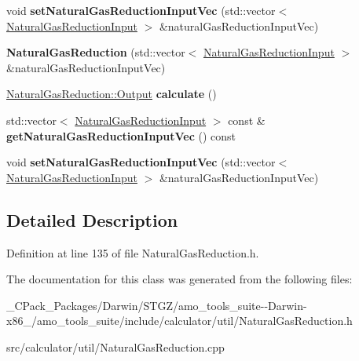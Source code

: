 \begin{DoxyCompactItemize}
\mbox{\label{class_natural_gas_reduction_a37d449a4d5f274fdebb855c1f8d0d32d}} 
void {\bfseries set\+Natural\+Gas\+Reduction\+Input\+Vec} (std\+::vector$<$ \hyperlink{class_natural_gas_reduction_input}{Natural\+Gas\+Reduction\+Input} $>$ \&natural\+Gas\+Reduction\+Input\+Vec)
\item 
\mbox{\label{class_natural_gas_reduction_a7648caebf3f12a0c7bb347e9d18e64d8}} 
{\bfseries Natural\+Gas\+Reduction} (std\+::vector$<$ \hyperlink{class_natural_gas_reduction_input}{Natural\+Gas\+Reduction\+Input} $>$ \&natural\+Gas\+Reduction\+Input\+Vec)
\item 
\mbox{\label{class_natural_gas_reduction_ae9eed40d094032c9b7a493e995d6d21d}} 
\hyperlink{struct_natural_gas_reduction_1_1_output}{Natural\+Gas\+Reduction\+::\+Output} {\bfseries calculate} ()
\item 
\mbox{\label{class_natural_gas_reduction_a3ad91a742c48fd1fcc39e8371efa46b6}} 
std\+::vector$<$ \hyperlink{class_natural_gas_reduction_input}{Natural\+Gas\+Reduction\+Input} $>$ const  \& {\bfseries get\+Natural\+Gas\+Reduction\+Input\+Vec} () const
\item 
\mbox{\label{class_natural_gas_reduction_a37d449a4d5f274fdebb855c1f8d0d32d}} 
void {\bfseries set\+Natural\+Gas\+Reduction\+Input\+Vec} (std\+::vector$<$ \hyperlink{class_natural_gas_reduction_input}{Natural\+Gas\+Reduction\+Input} $>$ \&natural\+Gas\+Reduction\+Input\+Vec)
\end{DoxyCompactItemize}


\subsection{Detailed Description}


Definition at line 135 of file Natural\+Gas\+Reduction.\+h.



The documentation for this class was generated from the following files\+:\begin{DoxyCompactItemize}
\item 
\+\_\+\+C\+Pack\+\_\+\+Packages/\+Darwin/\+S\+T\+G\+Z/amo\+\_\+tools\+\_\+suite-\/-\/\+Darwin-\/x86\+\_/amo\+\_\+tools\+\_\+suite/include/calculator/util/Natural\+Gas\+Reduction.\+h\item 
src/calculator/util/Natural\+Gas\+Reduction.\+cpp\end{DoxyCompactItemize}

